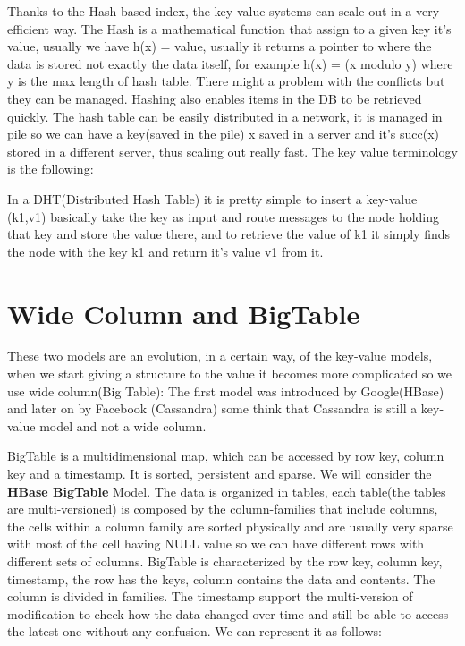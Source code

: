 \documentclass[a4page, 11pt]{article}
\begin{document}
Thanks to the Hash based index, the key-value systems can scale out in a very efficient way. 
The Hash is a mathematical function that assign to a given key it's value, usually we have h(x) = value, usually it returns a pointer to where the data is stored not exactly the data itself, for example h(x) = (x modulo y) where y is the max length of hash table. 
There might a problem with the conflicts but they can be managed. 
Hashing also enables items in the DB to be retrieved quickly. 
The hash table can be easily distributed in a network, it is managed in pile so we can have a key(saved in the pile) x saved in a server and it's succ(x) stored in a different server, thus scaling out really fast. 
The key value terminology is the following:

In a DHT(Distributed Hash Table) it is pretty simple to insert a key-value (k1,v1) basically take the key as input and route messages to the node holding that key and store the value there, and to retrieve the value of k1 it simply finds the node with the key k1 and return it's value v1 from it.

\section{Wide Column and BigTable}
These two models are an evolution, in a certain way, of the key-value models, when we start giving a structure to the value it becomes more complicated so we use wide column(Big Table): The first model was introduced by Google(HBase) and later on by Facebook (Cassandra) some think that Cassandra is still a key-value model and not a wide column.

BigTable is a multidimensional map, which can be accessed by row key, column key and a timestamp. It is sorted, persistent and sparse.
We will consider the \textbf{HBase BigTable} Model.
The data is organized in tables, each table(the tables are multi-versioned) is composed by the column-families that include columns, the cells within a column family are sorted physically and are usually very sparse with most of the cell having NULL value so we can have different rows with different sets of columns. 
BigTable is characterized by the row key, column key, timestamp, the row has the keys, column contains the data and contents. 
The column is divided in families. The timestamp support the multi-version of modification to check how the data changed over time and still be able to access the latest one without any confusion. We can represent it as follows:
\end{document}
